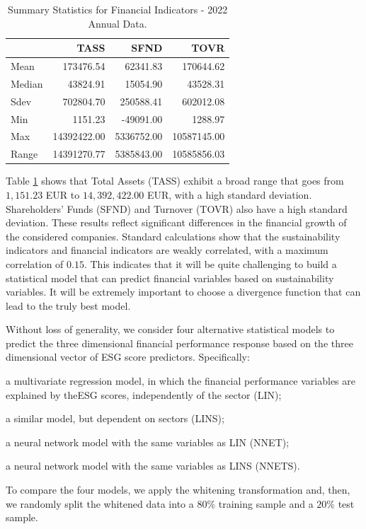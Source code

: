 \documentclass{article}
\begin{document}
\begin{table}[!ht]
    \centering
    \footnotesize
    \begin{tabular}{lrrr}
        \toprule
        & TASS & SFND & TOVR \\
        \midrule
        Mean   & 173476.54 & 62341.83  & 170644.62 \\
        Median & 43824.91  & 15054.90  & 43528.31  \\
        Sdev   & 702804.70 & 250588.41 & 602012.08 \\
        Min    & 1151.23   & -49091.00 & 1288.97   \\
        Max    & 14392422.00 & 5336752.00 & 10587145.00 \\
        Range  & 14391270.77 & 5385843.00 & 10585856.03 \\
        \bottomrule
    \end{tabular}
    \caption{Summary Statistics for Financial Indicators - 2022 Annual Data.}
    \label{Summary Statistics-FI}
\end{table}

% 

% 
Table \ref{Summary Statistics-FI} shows that  Total Assets (TASS) exhibit a broad range that goes from $1,151.23$ EUR to $14,392,422.00$ EUR, with a high standard deviation.
% 
Shareholders' Funds (SFND) and Turnover (TOVR) also have a high standard deviation. These results reflect significant differences in the financial growth of the considered companies.
% 
Standard calculations show that the   sustainability indicators and financial indicators are weakly correlated, with a maximum correlation of $0.15$. 
% 
This indicates that it will be quite challenging to build a statistical model that can predict financial variables based on sustainability variables. It will be extremely important to choose a divergence function that can lead to the truly best model. 
% 

% 

% 
Without loss of generality, we consider four alternative statistical models to predict the three dimensional financial performance response based on the three dimensional vector of ESG score predictors. Specifically:
\begin{enumerate*}[label=(\roman*)]
    \item a multivariate regression model, in which the financial performance variables are explained by theESG scores, independently of the sector (LIN);
    \item a similar model, but dependent on sectors (LINS);  
    \item a neural network model with the same variables as LIN (NNET);
     \item a neural network model with the same variables as LINS (NNETS).
    
\end{enumerate*} 
% 
To compare the four models, we apply the whitening transformation and, then, we randomly split the whitened data into a $80\%$ training sample and a $20\%$ test sample. 
\end{document}
